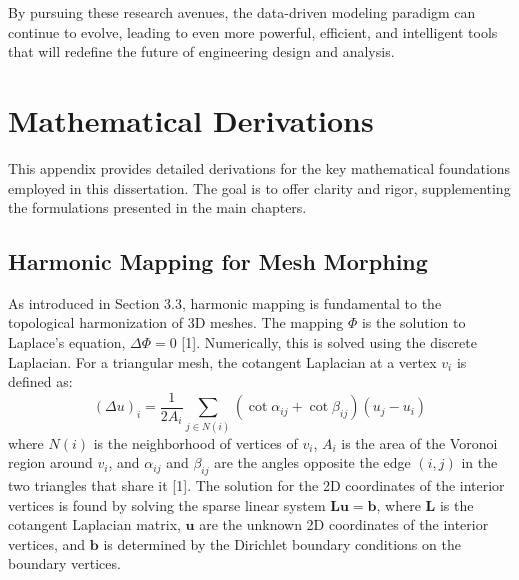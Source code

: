 \documentclass[dsc, EN]{ufabcFHZh}
\begin{document}
By pursuing these research avenues, the data-driven modeling paradigm can continue to evolve, leading to even more powerful, efficient, and intelligent tools that will redefine the future of engineering design and analysis.

\backmatter

%

%

%

\appendix
\chapter{Mathematical Derivations}
\label{app:math_derivations}

This appendix provides detailed derivations for the key mathematical foundations employed in this dissertation. The goal is to offer clarity and rigor, supplementing the formulations presented in the main chapters.

\section{Harmonic Mapping for Mesh Morphing}
\label{sec:harmonic_mapping_derivation}

As introduced in Section 3.3, harmonic mapping is fundamental to the topological harmonization of 3D meshes. The mapping $\Phi$ is the solution to Laplace's equation, $\Delta\Phi=0$ {[1]}. Numerically, this is solved using the discrete Laplacian. For a triangular mesh, the cotangent Laplacian at a vertex $v_i$ is defined as:
\begin{equation}
    (\Delta u)_i = \frac{1}{2A_i} \sum_{j \in N(i)} (\cot \alpha_{ij} + \cot \beta_{ij})(u_j - u_i)
\end{equation}
where $N(i)$ is the neighborhood of vertices of $v_i$, $A_i$ is the area of the Voronoi region around $v_i$, and $\alpha_{ij}$ and $\beta_{ij}$ are the angles opposite the edge $(i, j)$ in the two triangles that share it {[1]}. The solution for the 2D coordinates of the interior vertices is found by solving the sparse linear system $\mathbf{L}\mathbf{u} = \mathbf{b}$, where $\mathbf{L}$ is the cotangent Laplacian matrix, $\mathbf{u}$ are the unknown 2D coordinates of the interior vertices, and $\mathbf{b}$ is determined by the Dirichlet boundary conditions on the boundary vertices.
\end{document}
